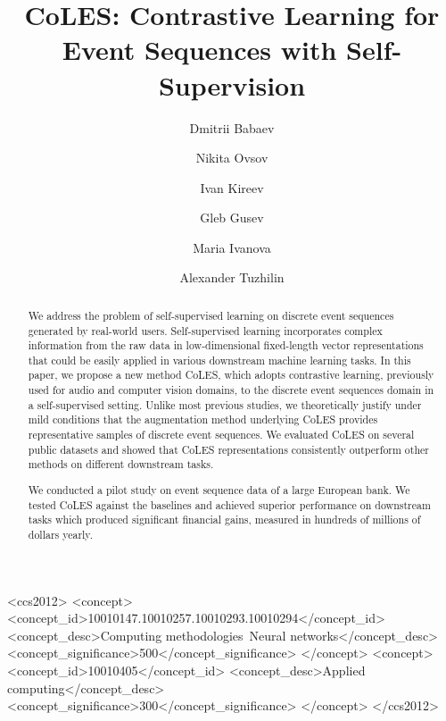 \documentclass[sigconf]{acmart}
\begin{document}
\title{CoLES: Contrastive Learning for Event Sequences with Self-Supervision}

\author{Dmitrii Babaev}

\author{Nikita Ovsov}

\author{Ivan Kireev}

\author{Gleb Gusev}

\author{Maria Ivanova}

\author{Alexander Tuzhilin}

\begin{abstract}
We address the problem of self-supervised learning on discrete event sequences generated by real-world users. Self-supervised learning incorporates complex information from the raw data in low-dimensional fixed-length vector representations that could be easily applied in various downstream machine learning tasks. In this paper, we propose a new method CoLES, which adopts contrastive learning, previously used for audio and computer vision domains, to the discrete event sequences domain in a self-supervised setting. Unlike most previous studies, we theoretically justify under mild conditions that the augmentation method underlying CoLES provides representative samples of discrete event sequences. We evaluated CoLES on several public datasets and showed that CoLES representations consistently outperform other methods on different downstream tasks.

We conducted a pilot study on event sequence data of a large European bank. We tested CoLES against the baselines and achieved superior performance on downstream tasks which produced significant financial gains, measured in hundreds of millions of dollars yearly.
\end{abstract}

\begin{CCSXML}
<ccs2012>
<concept>
<concept_id>10010147.10010257.10010293.10010294</concept_id>
<concept_desc>Computing methodologies~Neural networks</concept_desc>
<concept_significance>500</concept_significance>
</concept>
<concept>
<concept_id>10010405</concept_id>
<concept_desc>Applied computing</concept_desc>
<concept_significance>300</concept_significance>
</concept>
</ccs2012>
\end{CCSXML}
\end{document}
